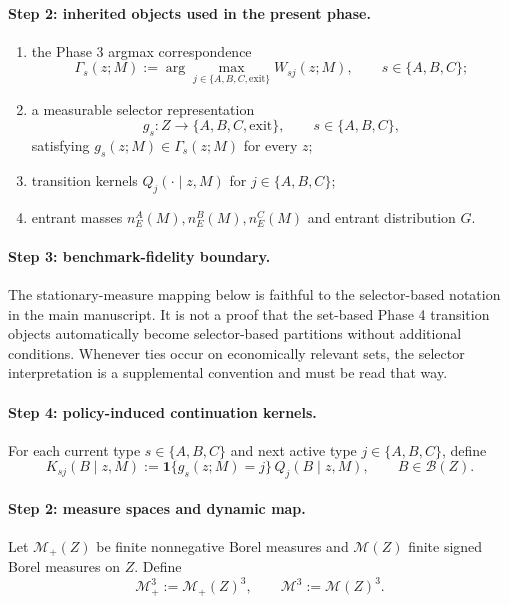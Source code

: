 \paragraph{Step 2: inherited objects used in the present phase.}
\begin{enumerate}
    \item the Phase 3 argmax correspondence
    \[
    \Gamma_s(z;M):=\arg\max_{j\in\{A,B,C,\mathrm{exit}\}}W_{sj}(z;M),
    \qquad s\in\{A,B,C\};
    \]
    \item a measurable selector representation
    \[
    g_s:Z\to\{A,B,C,\mathrm{exit}\},
    \qquad s\in\{A,B,C\},
    \]
    satisfying $g_s(z;M)\in\Gamma_s(z;M)$ for every $z$;
    \item transition kernels $Q_j(\cdot\mid z,M)$ for $j\in\{A,B,C\}$;
    \item entrant masses $n_E^A(M),n_E^B(M),n_E^C(M)$ and entrant distribution $G$.
\end{enumerate}

\paragraph{Step 3: benchmark-fidelity boundary.}
The stationary-measure mapping below is faithful to the selector-based notation in the main manuscript. It is not a proof that the set-based Phase 4 transition objects automatically become selector-based partitions without additional conditions. Whenever ties occur on economically relevant sets, the selector interpretation is a supplemental convention and must be read that way.

\paragraph{Step 4: policy-induced continuation kernels.}
For each current type $s\in\{A,B,C\}$ and next active type $j\in\{A,B,C\}$, define
\begin{equation}
K_{sj}(B\mid z,M):=\mathbf 1\{g_s(z;M)=j\}\,Q_j(B\mid z,M),
\qquad B\in\mathcal B(Z).
\label{eq:p7_Ksj}
\end{equation}

\paragraph{Step 2: measure spaces and dynamic map.}
Let $\mathcal M_+(Z)$ be finite nonnegative Borel measures and $\mathcal M(Z)$ finite signed Borel measures on $Z$.
Define
\[
\mathcal M_+^3:=\mathcal M_+(Z)^3,
\qquad
\mathcal M^3:=\mathcal M(Z)^3.
\]

